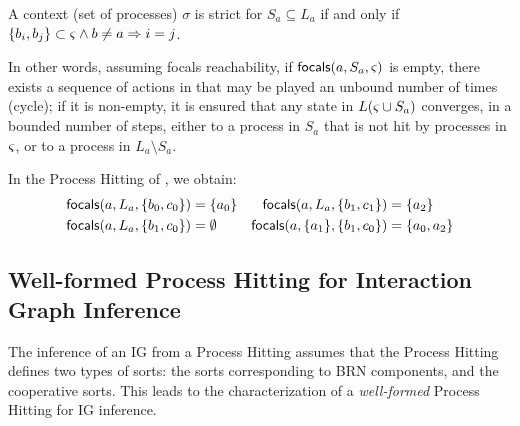 \begin{comment}
\begin{property}[$\focals$ reachability]\label{pro:focals-reach}
$\focals(a,S_a,\ctx)$ is reachable if and only if 
$\forall s\in L(\ctx\cup S_a)$,
if $\exists h\in \PHa(S_a,\ctx)$ with $\PHtarget(h)\in s$,
there exists a (possibly empty) sequence of actions
$h^1,\dots,h^n \in \PHa(\ctx\cup S_a)$
	such that $h^1,\dots,h^n,h$ are successively playable in $s$;
where $\PHa(\ctx) \DEF \{ \PHfrappe{b_i}{c_j}{c_k}\in\PHa \mid c\neq a \wedge
			b\in \PHsort(\ctx) \Rightarrow b_i\in \ctx \wedge c\in\PHsort(\ctx) \Rightarrow
			c_i\in\ctx \}$.
\end{property}
\end{comment}

\begin{definition}\label{def:strict-ctx}
A context (set of processes) $\sigma$ is strict for $S_a\subseteq L_a$ if and only if
$\{b_i,b_j\} \subset \varsigma \wedge b\neq a \Rightarrow i=j$.
\end{definition}

In other words, assuming focals reachability, if $\mathsf{focals}(a,S_a,\varsigma)$ is empty, there exists a
sequence of actions in that may be played an unbound number of times (cycle);
if it is non-empty, it is ensured that any state in $L(\varsigma\cup S_a)$ converges, in a bounded
number of steps, either to a process in $S_a$ that is not hit by processes in $\varsigma$, or to a process in
$L_a\setminus S_a$.

\begin{example*}
In the Process Hitting of , we obtain:
\begin{align*}
\mathsf{focals}(a,L_a,\{b_0,c_0\}) &= \{ a_0 \}
&
\mathsf{focals}(a,L_a,\{b_1,c_1\}) &= \{ a_2 \}
\\
\mathsf{focals}(a,L_a,\{b_1,c_0\}) &= \emptyset
&
\mathsf{focals}(a,\{a_1\},\{b_1,c_0\}) &= \{ a_0, a_2 \}
\end{align*}
\end{example*}

\subsection{Well-formed Process Hitting for Interaction Graph Inference}\label{ssec:wf}

The inference of an IG from a Process Hitting assumes that the Process Hitting defines two types of
sorts:
the sorts corresponding to BRN components, and the cooperative sorts.
This leads to the characterization of a \emph{well-formed} Process Hitting for IG inference.

